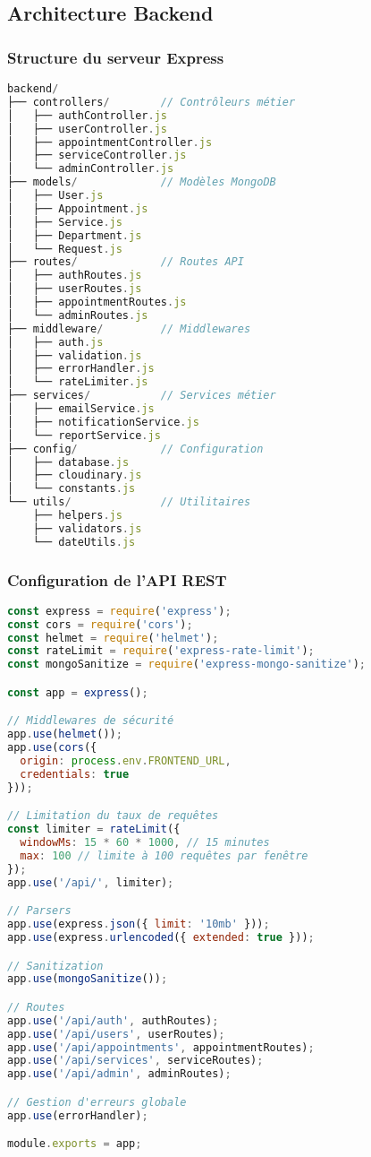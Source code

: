 \subsection{Architecture Backend}

\subsubsection{Structure du serveur Express}

\begin{lstlisting}[language=JavaScript, caption=Structure du serveur backend]
backend/
├── controllers/        // Contrôleurs métier
│   ├── authController.js
│   ├── userController.js
│   ├── appointmentController.js
│   ├── serviceController.js
│   └── adminController.js
├── models/             // Modèles MongoDB
│   ├── User.js
│   ├── Appointment.js
│   ├── Service.js
│   ├── Department.js
│   └── Request.js
├── routes/             // Routes API
│   ├── authRoutes.js
│   ├── userRoutes.js
│   ├── appointmentRoutes.js
│   └── adminRoutes.js
├── middleware/         // Middlewares
│   ├── auth.js
│   ├── validation.js
│   ├── errorHandler.js
│   └── rateLimiter.js
├── services/           // Services métier
│   ├── emailService.js
│   ├── notificationService.js
│   └── reportService.js
├── config/             // Configuration
│   ├── database.js
│   ├── cloudinary.js
│   └── constants.js
└── utils/              // Utilitaires
    ├── helpers.js
    ├── validators.js
    └── dateUtils.js
\end{lstlisting}

\subsubsection{Configuration de l'API REST}

\begin{lstlisting}[language=JavaScript, caption=Configuration Express de base]
const express = require('express');
const cors = require('cors');
const helmet = require('helmet');
const rateLimit = require('express-rate-limit');
const mongoSanitize = require('express-mongo-sanitize');

const app = express();

// Middlewares de sécurité
app.use(helmet());
app.use(cors({
  origin: process.env.FRONTEND_URL,
  credentials: true
}));

// Limitation du taux de requêtes
const limiter = rateLimit({
  windowMs: 15 * 60 * 1000, // 15 minutes
  max: 100 // limite à 100 requêtes par fenêtre
});
app.use('/api/', limiter);

// Parsers
app.use(express.json({ limit: '10mb' }));
app.use(express.urlencoded({ extended: true }));

// Sanitization
app.use(mongoSanitize());

// Routes
app.use('/api/auth', authRoutes);
app.use('/api/users', userRoutes);
app.use('/api/appointments', appointmentRoutes);
app.use('/api/services', serviceRoutes);
app.use('/api/admin', adminRoutes);

// Gestion d'erreurs globale
app.use(errorHandler);

module.exports = app;
\end{lstlisting}

